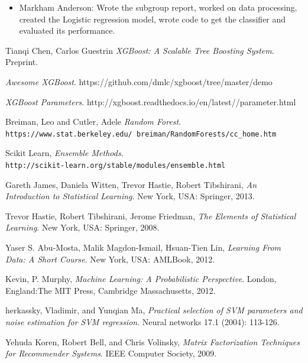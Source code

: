 \documentclass{article}
\begin{document}
\begin{spacing}{1}
\begin{large}
\begin{itemize}
	\item Markham Anderson: Wrote the subgroup report, worked on data processing, created the Logistic regression model, wrote code to get the classifier and evaluated its performance.
\end{itemize}

\newpage

\begin{thebibliography}{9}

	Tianqi Chen, Carlos Guestrin
	\emph{XGBoost: A Scalable Tree Boosting System}. Preprint.

	\emph{Awesome XGBoost}.
	https://github.com/dmlc/xgboost/tree/master/demo

	\emph{XGBoost Parameters}.
	http://xgboost.readthedocs.io/en/latest//parameter.html

	Breiman, Leo and Cutler, Adele
	\textit{Random Forest}.
	\\\texttt{https://www.stat.berkeley.edu/~breiman/RandomForests/cc\_home.htm}

	Scikit Learn,
	\textit{Ensemble Methods}.
	\\\texttt{http://scikit-learn.org/stable/modules/ensemble.html}

	Gareth James, Daniela Witten, Trevor Hastie, Robert Tibshirani, \textit{An Introduction to Statistical Learning}. New York, USA: Springer, 2013.

	Trevor Hastie, Robert Tibshirani, Jerome Friedman, \textit{The Elements of Statistical Learning}. New York, USA: Springer, 2008.

	Yaser S. Abu-Mosta, Malik Magdon-Ismail, Hsuan-Tien Lin, \textit{Learning From Data: A Short Course}. New York, USA: AMLBook, 2012.

	Kevin, P. Murphy, \textit{Machine Learning: A Probabilistic Perspective}. London, England:The MIT Press, Cambridge Massachusetts, 2012.

	herkassky, Vladimir, and Yunqian Ma, \textit{Practical selection of SVM parameters and noise estimation for SVM regression}. Neural networks 17.1 (2004): 113-126.

	Yehuda Koren, Robert Bell, and  Chris Volinsky,
	\textit{Matrix Factorization Techniques for Recommender Systems}. IEEE Computer Society, 2009.
\end{thebibliography}

\end{large}
\end{spacing}
\end{document}
